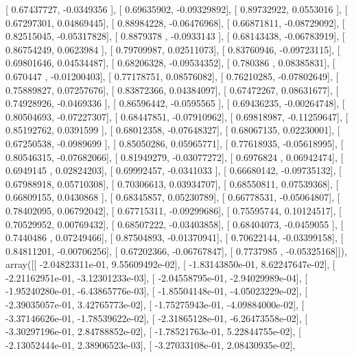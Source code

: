 \documentclass{article}
\begin{document}
       [ 0.67437727, -0.0349356 ],
       [ 0.69635902, -0.09329892],
       [ 0.89732922,  0.0553016 ],
       [ 0.67297301,  0.04869445],
       [ 0.88984228, -0.06476968],
       [ 0.66871811, -0.08729092],
       [ 0.82515045, -0.05317828],
       [ 0.8879378 , -0.0933143 ],
       [ 0.68143438, -0.06783919],
       [ 0.86754249,  0.0623984 ],
       [ 0.79709987,  0.02511073],
       [ 0.83760946, -0.09723115],
       [ 0.69801646,  0.04534487],
       [ 0.68206328, -0.09534352],
       [ 0.780386  ,  0.08385831],
       [ 0.670447  , -0.01200403],
       [ 0.77178751,  0.08576082],
       [ 0.76210285, -0.07802649],
       [ 0.75889827,  0.07257676],
       [ 0.83872366,  0.04384097],
       [ 0.67472267,  0.08631677],
       [ 0.74928926, -0.0469336 ],
       [ 0.86596442, -0.0595565 ],
       [ 0.69436235, -0.00264748],
       [ 0.80504693, -0.07227307],
       [ 0.68447851, -0.07910962],
       [ 0.69818987, -0.11259647],
       [ 0.85192762,  0.0391599 ],
       [ 0.68012358, -0.07648327],
       [ 0.68067135,  0.02230001],
       [ 0.67250538, -0.0989699 ],
       [ 0.85050286,  0.05965771],
       [ 0.77618935, -0.05618995],
       [ 0.80546315, -0.07682066],
       [ 0.81949279, -0.03077272],
       [ 0.6976824 ,  0.06942474],
       [ 0.6949145 ,  0.02824203],
       [ 0.69992457, -0.0341033 ],
       [ 0.66680142, -0.09735132],
       [ 0.67988918,  0.05710308],
       [ 0.70306613,  0.03934707],
       [ 0.68550811,  0.07539368],
       [ 0.66809155,  0.0430868 ],
       [ 0.68345857,  0.05230789],
       [ 0.66778531, -0.05064807],
       [ 0.78402095,  0.06792042],
       [ 0.67715311, -0.09299686],
       [ 0.75595744,  0.10124517],
       [ 0.70529952,  0.00769432],
       [ 0.68507222, -0.03403858],
       [ 0.68404073, -0.0459055 ],
       [ 0.7440486 ,  0.07249466],
       [ 0.87504893, -0.01370941],
       [ 0.70622144, -0.03399158],
       [ 0.84811201, -0.00706256],
       [ 0.67202366, -0.06767847],
       [ 0.7737985 , -0.05325168]]), array([[ -2.04823311e-01,   9.55609492e-02],
       [ -1.83143850e-01,   8.62247647e-02],
       [ -2.21162951e-01,  -3.12301233e-03],
       [ -2.04558795e-01,  -2.94029989e-04],
       [ -1.95240280e-01,  -6.43865776e-03],
       [ -1.85504148e-01,  -4.05023229e-02],
       [ -2.39035057e-01,   3.42765773e-02],
       [ -1.75275943e-01,  -4.09884000e-02],
       [ -3.37146626e-01,  -1.78539622e-02],
       [ -2.31865128e-01,  -6.26473558e-02],
       [ -3.30297196e-01,   2.84788852e-02],
       [ -1.78521763e-01,   5.22844755e-02],
       [ -2.13052444e-01,   2.38906523e-03],
       [ -3.27033108e-01,   2.08430935e-02],
\end{document}
